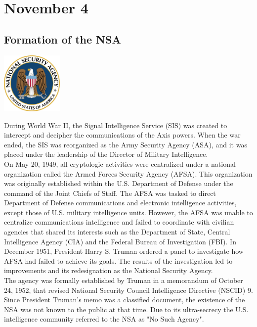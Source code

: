 \documentclass[11pt]{report}
\begin{document}
\section{November 4}
\subsection{Formation of the NSA}
\vspace{2mm}\begin{center}\includegraphics[width=3cm]{./img/NSALogo.jpg}\end{center}
During World War II, the Signal Intelligence Service (SIS) was created to intercept and decipher the communications of the Axis powers. When the war ended, the SIS was reorganized as the Army Security Agency (ASA), and it was placed under the leadership of the Director of Military Intelligence.\\
\indent On May 20, 1949, all cryptologic activities were centralized under a national organization called the Armed Forces Security Agency (AFSA). This organization was originally established within the U.S. Department of Defense under the command of the Joint Chiefs of Staff. The AFSA was tasked to direct Department of Defense communications and electronic intelligence activities, except those of U.S. military intelligence units. However, the AFSA was unable to centralize communications intelligence and failed to coordinate with civilian agencies that shared its interests such as the Department of State, Central Intelligence Agency (CIA) and the Federal Bureau of Investigation (FBI). In December 1951, President Harry S. Truman ordered a panel to investigate how AFSA had failed to achieve its goals. The results of the investigation led to improvements and its redesignation as the National Security Agency.\\
\indent The agency was formally established by Truman in a memorandum of October 24, 1952, that revised National Security Council Intelligence Directive (NSCID) 9. Since President Truman's memo was a classified document, the existence of the NSA was not known to the public at that time. Due to its ultra-secrecy the U.S. intelligence community referred to the NSA as "No Such Agency".
\end{document}
